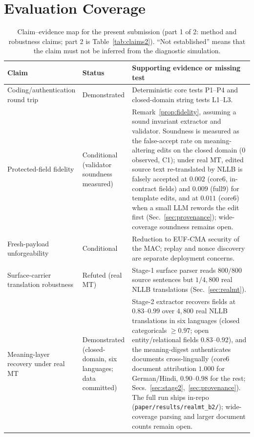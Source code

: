 \documentclass[11pt]{article}
\begin{document}
\section{Evaluation Coverage}

\begin{table}[t]
\centering
\small
\caption{Claim--evidence map for the present submission (part 1 of 2: method
and robustness claims; part 2 is Table~\ref{tab:claims2}). ``Not established''
means that the claim must not be inferred from the diagnostic simulation.}
\label{tab:claims}
\begin{tabularx}{\textwidth}{@{}>{\raggedright\arraybackslash}p{3.1cm}>{\raggedright\arraybackslash}p{3.0cm}X@{}}
\toprule
Claim & Status & Supporting evidence or missing test \\
\midrule
Coding/\allowbreak authentication round trip & Demonstrated & Deterministic core tests P1--P4 and closed-domain string tests L1--L3. \\
Protected-field fidelity & Conditional (validator soundness measured) & Remark~\ref{prop:fidelity}, assuming a sound invariant extractor and validator. Soundness is measured as the false-accept rate on meaning-altering edits on the closed domain ($0$ observed, C1); under real MT, edited source text re-translated by NLLB is falsely accepted at $0.002$ (core6, in-contract fields) and $0.009$ (full9) for template edits, and at $0.011$ (core6) when a small LLM rewords the edit first (Sec.~\ref{sec:provenance}); wide-coverage soundness remains open. \\
Fresh-payload unforgeability & Conditional & Reduction to EUF-CMA security of the MAC; replay and nonce discovery are separate deployment concerns. \\
Surface-carrier translation robustness & Refuted (real MT) & Stage-1 surface parser reads $800/800$ source sentences but $1/4{,}800$ real NLLB translations (Sec.~\ref{sec:realmt}). \\
Meaning-layer recovery under real MT & Demonstrated (closed-domain, six languages; data committed) & Stage-2 extractor recovers fields at $0.83$--$0.99$ over $4{,}800$ real NLLB translations in six languages (closed categoricals $\ge0.97$; open entity/relational fields $0.83$--$0.92$), and the meaning-digest authenticates documents cross-lingually (core6 document attribution $1.000$ for German/Hindi, $0.90$--$0.98$ for the rest; Secs.~\ref{sec:stage2},~\ref{sec:provenance}). The full run ships in-repo (\texttt{paper/results/realmt\_b2/}); wide-coverage parsing and larger document counts remain open. \\

\end{tabularx}
\end{table}
\end{document}
